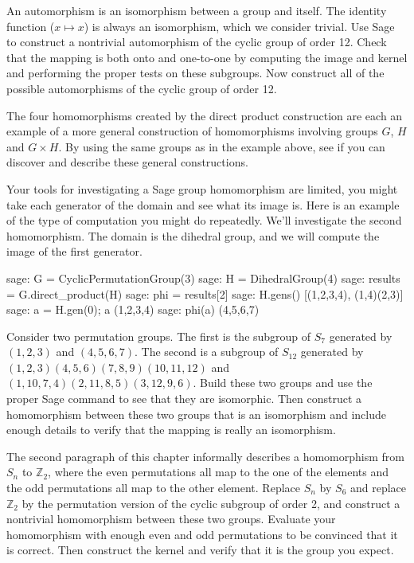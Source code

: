 \begin{sageverbatim}\end{sageverbatim}
%
%
An automorphism is an isomorphism between a group and itself.  The identity function ($x\mapsto x$) is always an isomorphism, which we consider trivial.  Use Sage to construct a nontrivial automorphism of the cyclic group of order 12.  Check that the mapping is both onto and one-to-one by computing the image and kernel and performing the proper tests on these subgroups.  Now construct all of the possible automorphisms of the cyclic group of order 12.
\begin{sageverbatim}\end{sageverbatim}
%
%
The four homomorphisms created by the direct product construction are each an example of a more general construction of homomorphisms involving groups $G$, $H$ and $G\times H$.  By using the same groups as in the example above, see if you can discover and describe these general constructions.\par
%
Your tools for investigating a Sage group homomorphism are limited, you might take each generator of the domain and see what its image is.  Here is an example of the type of computation you might do repeatedly.  We'll investigate the second homomorphism.  The domain is the dihedral group, and we will compute the image of the first generator.
%
\begin{sageexample}
sage: G = CyclicPermutationGroup(3)
sage: H = DihedralGroup(4)
sage: results = G.direct_product(H)
sage: phi = results[2]
sage: H.gens()
[(1,2,3,4), (1,4)(2,3)]
sage: a = H.gen(0); a
(1,2,3,4)
sage: phi(a)
(4,5,6,7)
\end{sageexample}
%
\begin{sageverbatim}\end{sageverbatim}
%
%
Consider two permutation groups.  The first is the subgroup of $S_7$ generated by $(1, 2, 3)$ and $(4, 5, 6, 7)$.  The second is a subgroup of $S_{12}$ generated by $(1, 2, 3)(4, 5, 6)(7, 8, 9)(10, 11, 12)$ and $(1, 10, 7, 4)(2, 11, 8, 5)(3, 12, 9, 6)$.  Build these two groups and use the proper Sage command to see that they are isomorphic.  Then construct a homomorphism between these two groups that is an isomorphism and include enough details to verify that the mapping is really an isomorphism.
\begin{sageverbatim}\end{sageverbatim}
%
%
The second paragraph of this chapter informally describes a homomorphism from $S_n$ to ${\mathbb Z}_2$, where the even permutations all map to the one of the elements and the odd permutations all map to the other element.  Replace $S_n$ by $S_6$ and replace ${\mathbb Z}_2$ by the permutation version of the cyclic subgroup of order 2, and construct a nontrivial homomorphism between these two groups.  Evaluate your homomorphism with enough even and odd permutations to be convinced that it is correct.  Then construct the kernel and verify that it is the group you expect.\par
